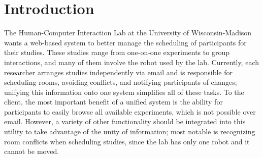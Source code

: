 \newcommand{\puttitle}{Milestone 2}



\section{Introduction}
The Human-Computer Interaction Lab at the University of Wisconsin-Madison wants a web-based system to better manage the scheduling of participants for their studies.  These studies range from one-on-one experiments to group interactions, and many of them involve the robot used by the lab.  Currently, each researcher arranges studies independently via email and is responsible for scheduling rooms, avoiding conflicts, and notifying participants of changes; unifying this information onto one system simplifies all of these tasks.  To the client, the most important benefit of a unified system is the ability for participants to easily browse all available experiments, which is not possible over email.  However, a variety of other functionality should be integrated into this utility to take advantage of the unity of information; most notable is recognizing room conflicts when scheduling studies, since the lab has only one robot and it cannot be moved.







